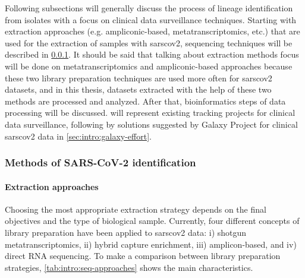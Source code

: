     Following subsections will generally discuss the process of lineage identification from isolates with a focus on clinical data surveillance techniques. Starting with extraction approaches (e.g. ampliconic-based, metatranscriptomics, etc.) that are used for the extraction of samples with \acrshort{sarscov2}, sequencing techniques will be described in \cref{sec:intro:virus-identification}. It should be said that talking about extraction methods focus will be done on metatranscriptomics and ampliconic-based approaches because these two library preparation techniques are used more often for \acrshort{sarscov2} datasets, and in this thesis, datasets extracted with the help of these two methods are processed and analyzed. After that, bioinformatics steps of data processing will be discussed.  will represent existing tracking projects for clinical data surveillance, following by solutions suggested by Galaxy Project for clinical \acrshort{sarscov2} data in \cref{sec:intro:galaxy-effort}.
        
        \subsubsection{Methods of SARS-CoV-2 identification} \label{sec:intro:virus-identification}
    
        \paragraph{Extraction approaches} 
        
        Choosing the most appropriate extraction strategy depends on the final objectives and the type of biological sample. Currently, four different concepts of library preparation have been applied to \acrshort{sarscov2} data: i) shotgun metatranscriptomics, ii) hybrid capture enrichment, iii) amplicon-based, and iv) direct RNA sequencing. To make a comparison between library preparation strategies, \cref{tab:intro:seq-approaches} shows the main characteristics.
        
